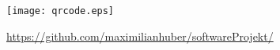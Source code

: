\newpage\thispagestyle{empty}
\begin{center}
\texttt{[image: qrcode.eps]}
\end{center}
\begin{center}
\url{https://github.com/maximilianhuber/softwareProjekt/}
\end{center}
